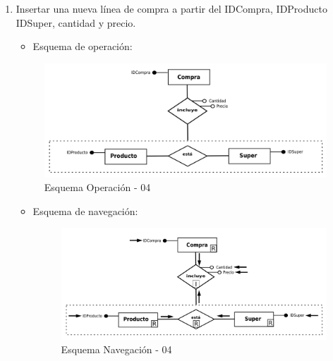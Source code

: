 \documentclass[a4paper,12pt]{report}
\begin{document}
\begin{enumerate}
\item Insertar una nueva línea de compra a partir del IDCompra, IDProducto
IDSuper, cantidad y precio.
\begin{itemize}
\item Esquema de operación:
\end{itemize}
\begin{figure}[!htp]
\centering
\includegraphics[width=0.9\linewidth]{./operaciones/img/Compras/04_ope.png}
\caption{Esquema Operación - 04}
\label{fig:ope04}
\medskip
\footnotesize
{}
\end{figure}
\begin{itemize}
\item Esquema de navegación:
\begin{figure}[!htp]
\centering
\includegraphics[width=0.9\linewidth]{./operaciones/img/Compras/04_nav.png}
\caption{Esquema Navegación - 04}
\label{fig:nave04}
\medskip
\footnotesize
{}
\end{figure}
\end{itemize}


\end{enumerate}
\end{document}
